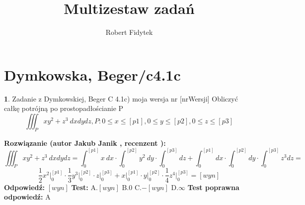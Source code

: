 \documentclass[12pt, a4paper]{article}
\title{Multizestaw zadań}
\author{Robert Fidytek}
\date{}
\theoremstyle{definition} %
\newtheorem{zad}{}
\newcommand{\kategoria}[1]{\section{#1}} %
\newcommand{\zadStart}[1]{\begin{zad}#1\newline} %
\newcommand{\zadStop}{\end{zad}}   %
\newcommand{\rozwStart}[2]{\noindent \textbf{Rozwiązanie (autor #1 , recenzent #2): }\newline} %
\newcommand{\rozwStop}{\newline}                                            %
\newcommand{\odpStart}{\noindent \textbf{Odpowiedź:}\newline}    %
\newcommand{\odpStop}{\newline}                                             %
\newcommand{\testStart}{\noindent \textbf{Test:}\newline} %
\newcommand{\testStop}{\newline} %
\newcommand{\kluczStart}{\noindent \textbf{Test poprawna odpowiedź:}\newline} %
\newcommand{\kluczStop}{\newline} %
\begin{document}
\maketitle


\kategoria{Dymkowska, Beger/c4.1c}
\zadStart{Zadanie z Dymkowskiej, Beger C 4.1c) moja wersja nr [nrWersji]}
Obliczyć całkę potrójną po prostopadłościanie P $$\iiint_P xy^2+z^3\ dxdydz, P: 0 \leq x \leq [p1], 0 \leq y \leq [p2], 0 \leq z \leq [p3]$$
\zadStop
\rozwStart{Jakub Janik}{}
$$\iiint_P xy^2+z^3\ dxdydz=\int_0^{[p1]}x\ dx \cdot \int_0^{[p2]}y^2\ dy\cdot \int_0^{[p3]}dz+\int_0^{[p1]}dx\cdot\int_0^{[p2]}dy\cdot\int_0^{[p3]}z^3dz=$$
$$\frac{1}{2}x^2\Big|_0^{[p1]}\cdot \frac{1}{3}y^3\Big|_0^{[p2]}\cdot z\Big|_0^{[p3]}+x\Big|_0^{[p1]}\cdot y\Big|_0^{[p2]}\cdot \frac{1}{4}z^4\Big|_0^{[p3]}=[wyn]$$
\rozwStop
\odpStart
$[wyn]$
\odpStop
\testStart
A.$[wyn]$
B.$0$
C.$-[wyn]$
D.$\infty$
\testStop
\kluczStart
A
\kluczStop
\end{document}
